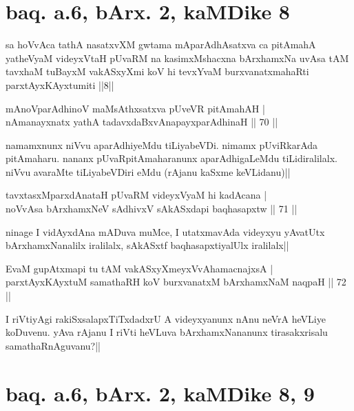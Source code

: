 
\section*{baq. a.6, bArx. 2, kaMDike 8}

\begin{shl}
sa hoVvAca tathA nasatxvXM gwtama mAparAdhAsatxva ca pitAmahA yatheVyaM videyxVtaH pUvaRM na kasimxMshacxna bArxhamxNa uvAsa tAM tavxhaM tuBayxM vakASxyXmi koV hi tevxYvaM burxvanatxmahaRti parxtAyxKAyxtumiti ||8||
\end{shl}

\begin{shl}
mAnoV\s parAdhinoV maMsAthxsatxva pUveVR pitAmahAH | \\
nAmanayxnatx yathA tadavxdaBxvAnapayxparAdhinaH \hfill|| 70 || 
\end{shl}

\begin{artha}
namamxnunx niVvu aparAdhiyeMdu tiLiyabeVDi. nimamx pUviRkarAda 
pitAmaharu. nananx pUvaRpitAmaharanunx aparAdhigaLeMdu tiLidiralilalx. 
niVvu avaraMte tiLiyabeVDiri eMdu (rAjanu kaSxme keVLidanu)||
\end{artha}

\begin{shl}
tavxtasxMparxdAnataH pUvaRM videyxVyaM hi kadAcana | \\
noVvAsa bArxhamxNeV sAdhivxV sAkASxdapi baqhasapxtw \hfill|| 71 || 
\end{shl}

\begin{artha}
ninage I vidAyxdAna mADuva muMce, I utatxmavAda videyxyu yAvatUtx 
bArxhamxNanalilx iralilalx, sAkASxtf baqhasapxtiyalUlx iralilalx||
\end{artha}

\begin{shl}
EvaM gupAtxmapi tu tAM vakASxyXmeyxVvAhamacnajxsA | \\
parxtAyxKAyxtuM samathaRH koV burxvanatxM bArxhamxNaM naqpaH \hfill|| 72 || 
\end{shl}

\begin{artha}
I riVtiyAgi rakiSxsalapxTiTxdadxrU A videyxyanunx nAnu neVrA heVLiye 
koDuvenu. yAva rAjanu I riVti heVLuva bArxhamxNananunx tirasakxrisalu 
samathaRnAguvanu?||
\end{artha}

\section*{baq. a.6, bArx. 2, kaMDike 8, 9}

